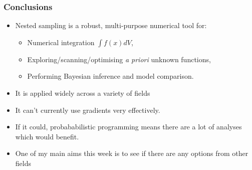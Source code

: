 \documentclass[aspectratio=169]{beamer}
\begin{document}
%
%
%    


\begin{frame}
    \frametitle{Conclusions}
    \begin{itemize}
        \item Nested sampling is a robust, multi-purpose numerical tool for:
            \begin{itemize}
                \item Numerical integration $\int f(x) dV$,
                \item Exploring/scanning/optimising \textit{a priori} unknown functions,
                \item Performing Bayesian inference and model comparison.
            \end{itemize}
        \item It is applied widely across a variety of fields
        \item It can't currently use gradients very effectively.
        \item If it could, probababilistic programming means there are a lot of analyses which would benefit.
        \item One of my main aims this week is to see if there are any options from other fields
    \end{itemize}
\end{frame}
\end{document}
